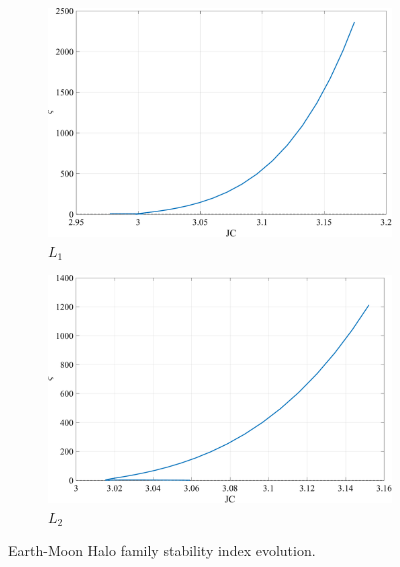 \begin{figure}[H]
    \begin{subfigure}[h]{0.4\linewidth}
        \includegraphics[width=\textwidth]{figures/L1HaloStability.pdf}
        \caption{$L_{1}$}
    \end{subfigure}
    \hfill
    \begin{subfigure}[h]{0.4\linewidth}
        \includegraphics[width=\textwidth]{figures/L2HaloStability.pdf}
        \caption{$L_{2}$}
    \end{subfigure}
    \caption{Earth-Moon Halo family stability index evolution.}
    \label{fig:haloStability}
\end{figure}

